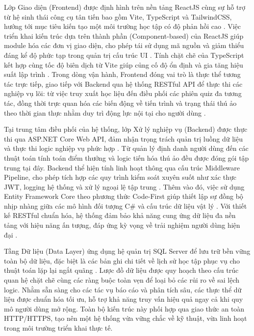 Lớp Giao diện (Frontend) được định hình trên nền tảng ReactJS cùng sự hỗ trợ từ hệ sinh thái công cụ tân tiến bao gồm Vite, TypeScript và TailwindCSS, hướng tới mục tiêu kiến tạo một môi trường học tập có độ phản hồi cao \cite{ReactDocs2024, ViteDocs2024}. Việc triển khai kiến trúc dựa trên thành phần (Component-based) của ReactJS giúp module hóa các đơn vị giao diện, cho phép tái sử dụng mã nguồn và giảm thiểu đáng kể độ phức tạp trong quản trị cấu trúc UI \cite{ReactVirtualDOM2024}. Tính chặt chẽ của TypeScript kết hợp cùng tốc độ biên dịch từ Vite giúp củng cố độ ổn định và gia tăng hiệu suất lập trình \cite{TypeScriptDocs2024}. Trong dòng vận hành, Frontend đóng vai trò là thực thể tương tác trực tiếp, giao tiếp với Backend qua hệ thống RESTful API để thực thi các nghiệp vụ lõi: từ việc truy xuất học liệu đến điều phối các phiên quiz đa tương tác, đồng thời trực quan hóa các biến động về tiến trình và trạng thái thú ảo theo thời gian thực nhằm duy trì động lực nội tại cho người dùng \cite{Hamari2014}.

Tại trung tâm điều phối của hệ thống, lớp Xử lý nghiệp vụ (Backend) được thực thi qua ASP.NET Core Web API, đảm nhận trọng trách quản trị luồng dữ liệu và thực thi logic nghiệp vụ phức hợp \cite{MicrosoftASPNETCore2024}. Từ quản lý định danh người dùng đến các thuật toán tính toán điểm thưởng và logic tiến hóa thú ảo đều được đóng gói tập trung tại đây. Backend thể hiện tính linh hoạt thông qua cấu trúc Middleware Pipeline, cho phép tích hợp các quy trình kiểm soát xuyên suốt như xác thực JWT, logging hệ thống và xử lý ngoại lệ tập trung \cite{MiddlewareDocs2024}. Thêm vào đó, việc sử dụng Entity Framework Core theo phương thức Code-First giúp thiết lập sự đồng bộ nhịp nhàng giữa các mô hình đối tượng C\# và cấu trúc dữ liệu vật lý \cite{MicrosoftEFCore2024}. Với thiết kế RESTful chuẩn hóa, hệ thống đảm bảo khả năng cung ứng dữ liệu đa nền tảng với hiệu năng ấn tượng, đáp ứng kỳ vọng về trải nghiệm người dùng hiện đại \cite{TechEmpower2024}.

\newpage
Tầng Dữ liệu (Data Layer) ứng dụng hệ quản trị SQL Server để lưu trữ bền vững toàn bộ dữ liệu, đặc biệt là các bản ghi chi tiết về lịch sử học tập phục vụ cho thuật toán lặp lại ngắt quãng \cite{SQLServerDocs2024, MemriseHelp2024}. Lược đồ dữ liệu được quy hoạch theo cấu trúc quan hệ chặt chẽ cùng các ràng buộc toàn vẹn để loại bỏ các rủi ro về sai lệch logic. Nhằm sẵn sàng cho các tác vụ báo cáo và phân tích sâu, các thực thể dữ liệu được chuẩn hóa tối ưu, hỗ trợ khả năng truy vấn hiệu quả ngay cả khi quy mô người dùng mở rộng. Toàn bộ kiến trúc này phối hợp qua giao thức an toàn HTTP/HTTPS, tạo nên một hệ thống vừa vững chắc về kỹ thuật, vừa linh hoạt trong môi trường triển khai thực tế.

